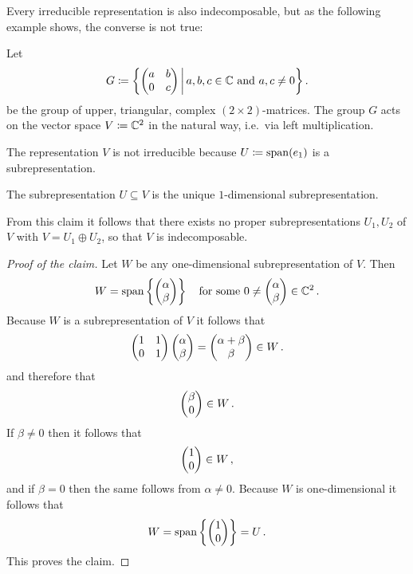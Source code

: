\begin{fluff}
  Every irreducible representation is also indecomposable, but as the following example shows, the converse is not true:
\end{fluff}

\begin{example}
  \label{example: upper triangular action on C2}
  Let
  \[
              G
    \coloneqq \left\{
                \begin{pmatrix}
                  a & b \\
                  0 & c
                \end{pmatrix}
              \,\middle|\,
                a, b, c \in \mathbb{C}
                \text{ and }
                a, c \neq 0
              \right\} .
  \]
  be the group of upper, triangular, complex $(2 \times 2)$-matrices.
  The group $G$ acts on the vector space $V \coloneqq \mathbb{C}^2$ in the natural way, i.e.\ via left multiplication.
  
  The representation $V$ is not irreducible because $U \coloneqq \operatorname{span}(e_1)$ is a subrepresentation.
  \begin{claim}
    The subrepresentation $U \subseteq V$ is the unique $1$-dimensional subrepresentation.
  \end{claim}
  From this claim it follows that there exists no proper subrepresentations $U_1, U_2$ of $V$ with $V = U_1 \oplus U_2$, so that $V$ is indecomposable.
  \begin{proof}[Proof of the claim]
    Let $W$ be any one-dimensional subrepresentation of $V$.
    Then
    \[
        W
      = \operatorname{span}\left\{
                \begin{pmatrix}\alpha \\ \beta\end{pmatrix}
              \right\}
      \quad
      \text{for some $0 \neq  \begin{pmatrix}\alpha \\ \beta\end{pmatrix} \in   \mathbb{C}^2$} \,.
    \]
    Because $W$ is a subrepresentation of $V$ it follows that
    \[
          \begin{pmatrix}
            1 & 1 \\
            0 & 1
          \end{pmatrix}
          \begin{pmatrix}\alpha \\ \beta\end{pmatrix}
      =   \begin{pmatrix}\alpha + \beta \\ \beta\end{pmatrix}
      \in W \,.
    \]
    and therefore that
    \[
      \begin{pmatrix}\beta \\ 0\end{pmatrix} \in W \,.
    \]
    If $\beta \neq 0$ then it follows that
    \[
      \begin{pmatrix}1 \\ 0\end{pmatrix} \in W \,,
    \]
    and if $\beta = 0$ then the same follows from $\alpha \neq 0$.
    Because $W$ is one-dimensional it follows that
    \[
        W
      = \operatorname{span} \left\{ \begin{pmatrix}1 \\ 0\end{pmatrix} \right\}
      = U \,.
    \]
    This proves the claim.
  \end{proof}
\end{example}


